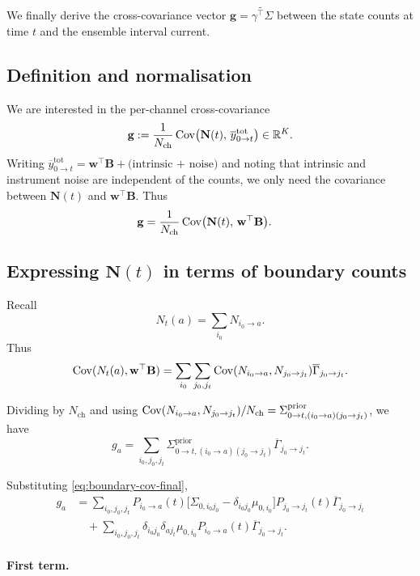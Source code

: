 \documentclass[11pt]{article}
\begin{document}
We finally derive the cross-covariance vector
\(\mathbf{g}=\widetilde{\gamma^\top\Sigma}\) between the state counts at time
\(t\) and the ensemble interval current.

\subsection{Definition and normalisation}

We are interested in the per-channel cross-covariance
\[
  \mathbf{g}
  :=
  \frac{1}{N_{\text{ch}}}
  \operatorname{Cov}\bigl(\mathbf{N}(t),\,\overline{y}^{\text{tot}}_{0\to t}\bigr)
  \in\mathbb{R}^K.
\]
Writing
\(\overline{y}^{\text{tot}}_{0\to t} = \mathbf{w}^\top\mathbf{B} + \text{(intrinsic + noise)}\)
and noting that intrinsic and instrument noise are independent of the counts, we
only need the covariance between \(\mathbf{N}(t)\) and \(\mathbf{w}^\top\mathbf{B}\).
Thus
\begin{align*}
  \mathbf{g}
  &=
  \frac{1}{N_{\text{ch}}}
  \operatorname{Cov}\bigl(\mathbf{N}(t),\,\mathbf{w}^\top\mathbf{B}\bigr).
\end{align*}

\subsection{Expressing \texorpdfstring{$\mathbf{N}(t)$}{N(t)} in terms of boundary counts}

Recall
\[
  N_t(a) = \sum_{i_0} N_{i_0\to a}.
\]
Thus
\[
  \operatorname{Cov}(N_t(a),\mathbf{w}^\top\mathbf{B})
  =
  \sum_{i_0}
  \sum_{j_0,j_t}
  \operatorname{Cov}(N_{i_0\to a},N_{j_0\to j_t})
  \overline{\Gamma}_{j_0\to j_t}.
\]

Dividing by \(N_{\text{ch}}\) and using
\(\operatorname{Cov}(N_{i_0\to a},N_{j_0\to j_t})/N_{\text{ch}}
= \Sigma^{\text{prior}}_{0\to t,(i_0\to a)(j_0\to j_t)}\),
we have
\[
  g_a
  =
  \sum_{i_0,j_0,j_t}
  \Sigma^{\text{prior}}_{0\to t,(i_0\to a)(j_0\to j_t)}
  \overline{\Gamma}_{j_0\to j_t}.
\]

Substituting \eqref{eq:boundary-cov-final},
\begin{align*}
  g_a
  &=
  \sum_{i_0,j_0,j_t}
  P_{i_0\to a}(t)
  \bigl[
    \Sigma_{0,i_0 j_0}
    - \delta_{i_0 j_0}\mu_{0,i_0}
  \bigr]
  P_{j_0\to j_t}(t)
  \overline{\Gamma}_{j_0\to j_t}
  \\
  &\quad
  +
  \sum_{i_0,j_0,j_t}
  \delta_{i_0 j_0}
  \delta_{a j_t}
  \mu_{0,i_0}
  P_{i_0\to a}(t)
  \overline{\Gamma}_{j_0\to j_t}.
\end{align*}

\paragraph{First term.}
\end{document}
